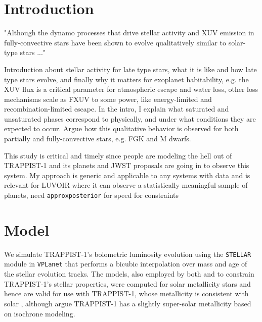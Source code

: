 \documentclass[twocolumn]{aastex62}
\newcommand{\vplanet}[0]{\texttt{VPLanet}\xspace}
\newcommand{\approxposterior}[0]{\texttt{approxposterior}\xspace}
\newcommand{\stellar}[0]{\texttt{STELLAR}\xspace}
\begin{document}

\keywords{}


\section{Introduction} \label{sec:intro}

"Although the dynamo processes that drive stellar activity and XUV emission in fully-convective stars have been shown to evolve qualitatively similar to solar-type stars \citep{Wright2016,Wright2018} ..."

Introduction about stellar activity for late type stars, what it is like and how late type stars evolve, and finally why it matters for exoplanet habitability, e.g. the XUV flux is a critical parameter for atmospheric escape and water loss, other loss mechanisms scale as FXUV to some power, like energy-limited and recombination-limited escape. In the intro, I explain what saturated and unsaturated phases correspond to physically, and under what conditions they are expected to occur. Argue how this qualitative behavior is observed for both partially and fully-convective stars, e.g. FGK and M dwarfs.

This study is critical and timely since people are modeling the hell out of TRAPPIST-1 and its planets and JWST proposals are going in to observe this system. My approach is generic and applicable to any systems with data and is relevant for LUVOIR where it can observe a statistically meaningful sample of planets, need \approxposterior for speed for constraints

\section{Model} \label{sec:model}

We simulate TRAPPIST-1's bolometric luminosity evolution using the \stellar module in \vplanet \citep{Barnes2016,vplanet2018} that performs a bicubic interpolation over mass and age of the \citet{Baraffe2015} stellar evolution tracks. The \citet{Baraffe2015} models, also employed by both \citet{Burgasser2017} and \citet{vanGrootel2018} to constrain TRAPPIST-1's stellar properties, were computed for solar metallicity stars and hence are valid for use with TRAPPIST-1, whose metallicity is consistent with solar \citep{Gillon2016}, although \citet{Burgasser2017} argue TRAPPIST-1 has a slightly super-solar metallicity based on isochrone modeling.
\end{document}
